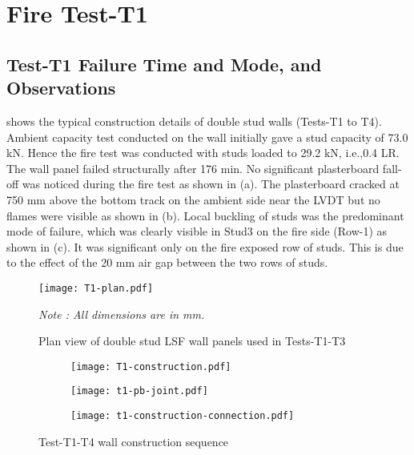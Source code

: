 \section{Fire Test-T1}
\subsection{Test-T1 Failure Time and Mode, and Observations}

 shows the typical construction details of double stud walls (Tests-T1 to T4). Ambient capacity test conducted on the wall initially gave a stud capacity of 73.0 kN. Hence the fire test was conducted with studs loaded to 29.2 kN, i.e.,0.4 LR. The wall panel failed structurally after 176 min. No significant plasterboard fall-off was noticed during the fire test as shown in  (a). The plasterboard cracked at 750 mm above the bottom track on the ambient side near the LVDT but no flames were visible as shown in  (b). Local buckling of studs was the predominant mode of failure, which was clearly visible in Stud3 on the fire side (Row-1) as shown in  (c). It was significant only on the fire exposed row of studs. This is due to the effect of the 20 mm air gap between the two rows of studs. 
\begin{figure}[htbp]
	\centering
	\texttt{[image: T1-plan.pdf]}
	\caption{Plan view of double stud LSF wall panels used in Tests-T1-T3}
	\label{fig:T1-plan}
	\fontsize{10}{1}\textit{Note : All dimensions are in mm.}
\end{figure}
\begin{figure}[!htbp]
	\centering
	\begin{subfigure}[b]{0.5\textwidth}
		\centering
		\texttt{[image: T1-construction.pdf]}
		\caption{}
		\label{subfig:T1-construction}
	\end{subfigure}
	\begin{subfigure}[b]{0.5\textwidth}
		\centering
		\texttt{[image: t1-pb-joint.pdf]}
		\caption{}
		\label{subfig:t1-pb-joint}
	\end{subfigure}
	\begin{subfigure}[b]{0.5\textwidth}
		\centering
		\texttt{[image: t1-construction-connection.pdf]}
		\caption{}
		\label{subfig:t1-construction-connection}
	\end{subfigure}
	   \caption{Test-T1-T4 wall construction sequence}
	   \label{fig:t1-construction-sequence}
\end{figure}
